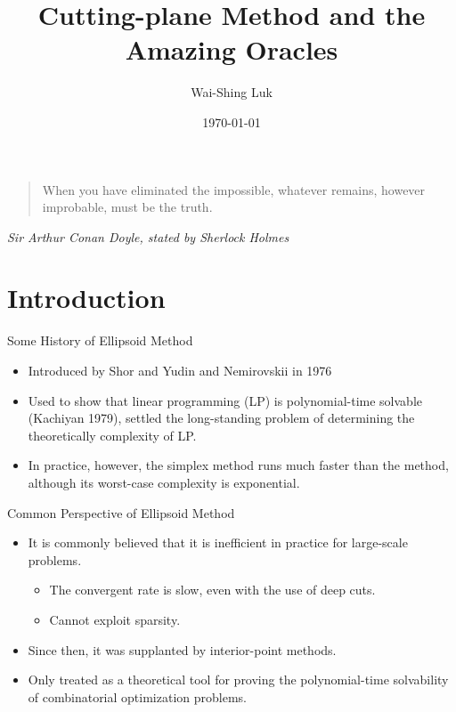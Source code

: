 \documentclass[10pt,ignorenonframetext,serif,onlymath]{beamer}
\title{Cutting-plane Method and the Amazing Oracles}
\author{Wai-Shing Luk}
\institute{Fudan University}
\date{\today}
\begin{document}
\frame{\titlepage}

\begin{frame}
\tableofcontents[hideallsubsections]
\end{frame}
\begin{frame}

\begin{quote}
When you have eliminated the impossible, whatever remains, however
improbable, must be the truth.
\end{quote}

\emph{Sir Arthur Conan Doyle, stated by Sherlock Holmes}

\end{frame}

\hypertarget{introduction}{%
\section{Introduction}\label{introduction}}

\begin{frame}{Some History of Ellipsoid Method}
\protect\hypertarget{some-history-of-ellipsoid-method}{}

\begin{itemize}
\item
  Introduced by Shor and Yudin and Nemirovskii in 1976
\item
  Used to show that linear programming (LP) is polynomial-time solvable
  (Kachiyan 1979), settled the long-standing problem of determining the
  theoretically complexity of LP.
\item
  In practice, however, the simplex method runs much faster than the
  method, although its worst-case complexity is exponential.
\end{itemize}

\end{frame}

\begin{frame}{Common Perspective of Ellipsoid Method}
\protect\hypertarget{common-perspective-of-ellipsoid-method}{}

\begin{itemize}
\item
  It is commonly believed that it is inefficient in practice for
  large-scale problems.

  \begin{itemize}
  \item
    The convergent rate is slow, even with the use of deep cuts.
  \item
    Cannot exploit sparsity.
  \end{itemize}
\item
  Since then, it was supplanted by interior-point methods.
\item
  Only treated as a theoretical tool for proving the polynomial-time
  solvability of combinatorial optimization problems.
\end{itemize}

\end{frame}
\end{document}
